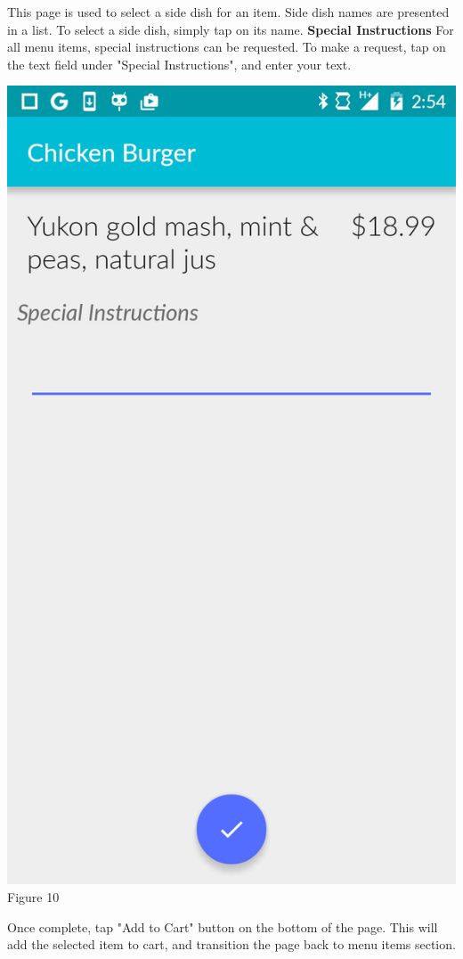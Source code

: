 \documentclass[12pt, titlepage]{article}
\begin{document}
This page is used to select a side dish for an item. Side dish names are presented in a list. To select a side dish, simply tap on its name.\pagebreak \newline
\textbf{Special Instructions}\newline
For all menu items, special instructions can be requested. To make a request, tap on the text field under "Special Instructions", and enter your text. 
\begin{center}\includegraphics[scale=0.15]{instructions.png}	\linebreak Figure 10\end{center}
Once complete, tap "Add to Cart" button on the bottom of the page. This will add the selected item to cart, and transition the page back to menu items section. 
\end{document}

